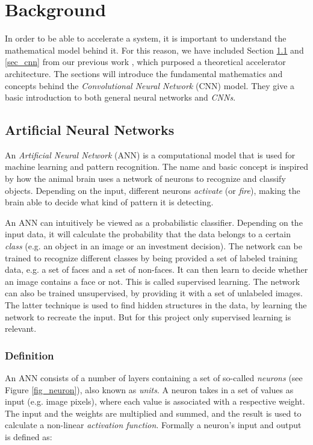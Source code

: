 \chapter{Background} \label{chap_background}

In order to be able to accelerate a system, it is important to understand the mathematical model behind it. For this reason, we have included Section \ref{sec_ann} and \ref{sec_cnn}  from our previous work \cite{Halvorsen2014}, which purposed a theoretical accelerator architecture. The sections will introduce the fundamental mathematics and concepts behind the \textit{Convolutional Neural Network} (CNN) model. They give a basic introduction to both general neural networks and \textit{CNNs}. 

\section{Artificial Neural Networks}\label{sec_ann}

An \textit{Artificial Neural Network} (ANN) \cite{Minsky1969}\cite{Bishop2006} is a computational model that is used for machine learning and pattern recognition. The name and basic concept is inspired by how the animal brain uses a network of neurons to recognize and classify objects. Depending on the input, different neurons \textit{activate} (or \textit{fire}), making the brain able to decide what kind of pattern it is detecting. 

An ANN can intuitively be viewed as a probabilistic classifier. Depending on the input data, it will calculate the probability that the data belongs to a certain \textit{class} (e.g. an object in an image or an investment decision). The network can be trained to recognize different classes by being provided a set of labeled training data, e.g. a set of faces and a set of non-faces. It can then learn to decide whether an image contains a face or not. This is called supervised learning. The network can also be trained unsupervised, by providing it with a set of unlabeled images. The latter technique is used to find hidden structures in the data, by learning the network to recreate the input. But for this project only supervised learning is relevant.  

\subsection{Definition} \hfill \break
An ANN  consists of a number of layers containing a set of so-called \textit{neurons} (see Figure \ref{fig_neuron}), also known as \textit{units}. A neuron takes in a set of values as input (e.g. image pixels), where each value is associated with a respective weight. The input and the weights are multiplied and summed, and the result is used to calculate a non-linear \textit{activation function}. Formally a neuron's input and output is defined as:


